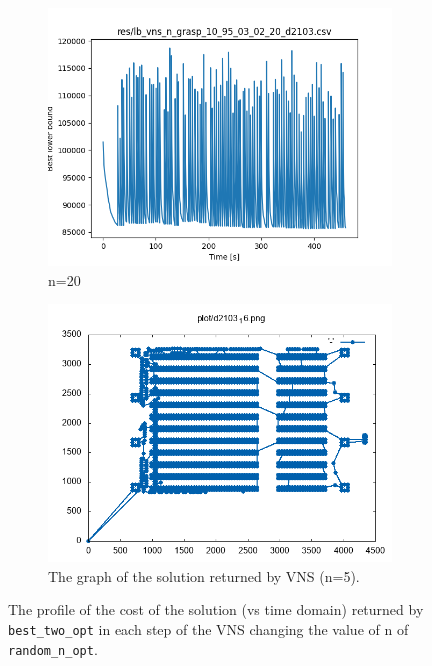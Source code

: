 \begin{figure}[!h]
\begin{subfigure}{.5\columnwidth}
		\includegraphics[width=\columnwidth]{../res/lb_vns_n_grasp_10_95_03_02_20_d2103.png}
		\caption{n=20}
		\label{fig:lb_vns_n_grasp_10_95_03_02_20_d2103}
	\end{subfigure}
	\begin{subfigure}{.5\columnwidth}
		\centering
		\includegraphics[width=\columnwidth]{../res/d2103_16.png}
		\caption{The graph of the solution returned by VNS (n=5).}
		\label{fig:d2103_16}
	\end{subfigure}
	\caption{The profile of the cost of the solution (vs time domain) returned by \texttt{best\_two\_opt} in each step of the VNS changing the value of n of \texttt{random\_n\_opt}.}
	\label{fig:lb_vns}
\end{figure}
